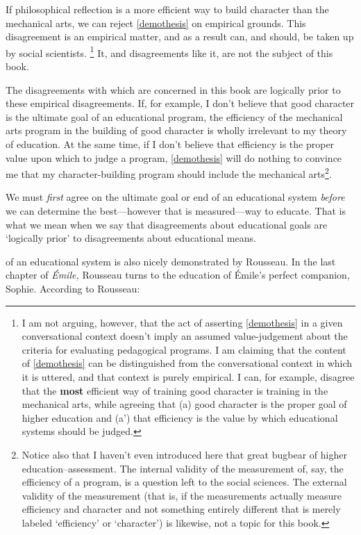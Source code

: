 If philosophical reflection is a more efficient way to build character than the mechanical arts, we can reject \ref{demothesis} on empirical grounds. This disagreement is an empirical matter, and as a result can, and should, be taken up by social scientists. \footnote{I am not arguing, however, that the act of asserting \ref{demothesis} in a given conversational context doesn't imply an assumed value-judgement about the criteria for evaluating pedagogical programs. I am claiming that the content of \ref{demothesis} can be distinguished from the conversational context in which it is uttered, and that context is purely empirical. I can, for example, disagree that the \textbf{most} efficient way of training good character is training in the mechanical arts, while agreeing that (a) good character is the proper goal of higher education and (a') that efficiency is the value by which educational systems should be judged.} It, and disagreements like it, are not the subject of this book.

The disagreements with which are concerned in this book are logically prior to these empirical disagreements. If, for example, I don't believe that good character is the ultimate goal of an educational program, the efficiency of the mechanical arts program in the building of good character is wholly irrelevant to my theory of education. At the same time, if I don't believe that efficiency is the proper value upon which to judge a program, \ref{demothesis} will do nothing to convince me that my character-building program should include the mechanical arts\footnote{Notice also that I haven't even introduced here that great bugbear of higher education--assessment. The internal validity of the measurement of, say, the efficiency of a program, is a question left to the social sciences. The external validity of the measurement (that is, if the measurements actually measure efficiency and character and not something entirely different that is merely labeled `efficiency' or `character') is likewise, not a topic for this book.}.

We must \emph{first} agree on the ultimate goal or end of an educational system \emph{before} we can determine the best---however that is measured---way to educate. That is what we mean when we say that disagreements about educational goals are `logically prior' to disagreements about educational means. 

 of an educational system is also nicely demonstrated by Rousseau. In the last chapter of \emph{Émile,} Rousseau turns to the education of Émile's perfect companion, Sophie. According to Rousseau:

